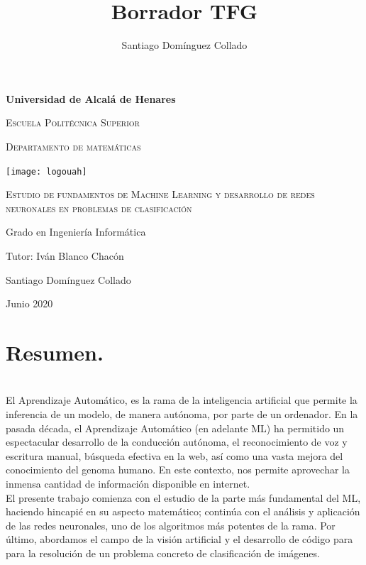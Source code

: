 \documentclass[a4paper,11pt]{article}
\author{Santiago Domínguez Collado}
\title{Borrador TFG}
\begin{document}
\begin{titlepage}
\centering
{\bfseries\LARGE Universidad de Alcalá de Henares \par}
\vspace{0.5cm}
{\scshape\Large Escuela Politécnica Superior \par}
\vspace{0.5cm}
{\scshape\Large Departamento de matemáticas \par}

\vspace{1.5cm}
{\texttt{[image: logouah]}} 


\vspace{1cm}
{\scshape\Large Estudio de fundamentos de Machine Learning y desarrollo de redes neuronales en problemas de clasificación \par}
\vspace{3cm}

{\Large Grado en Ingeniería Informática \par}
\vspace{0.5cm}
{\Large Tutor: Iván Blanco Chacón\par}
\vspace{0.5cm}
{\Large Santiago Domínguez Collado \par}
\vfill
{\Large Junio 2020 \par}
\end{titlepage}


\tableofcontents

\newpage
\chapter{\textbf{\large Resumen.}}\\


El Aprendizaje Automático, es la rama de la inteligencia artificial que permite la inferencia de un modelo, de manera autónoma, por parte de un ordenador. En la pasada década, el Aprendizaje Automático (en adelante ML) ha permitido un espectacular desarrollo de la conducción autónoma, el reconocimiento de voz y escritura manual, búsqueda efectiva en la web, así como una vasta mejora del conocimiento del genoma humano. En este contexto, nos permite aprovechar la inmensa cantidad de información disponible en internet.\\

\noindent
El presente trabajo comienza con el estudio de la parte más fundamental del ML, haciendo hincapié en su aspecto matemático; continúa con el análisis y aplicación de las redes neuronales, uno de los algoritmos más potentes de la rama. Por último, abordamos el campo de la visión artificial y el desarrollo de código para para la resolución de un problema concreto de clasificación de imágenes.\\
\end{document}
